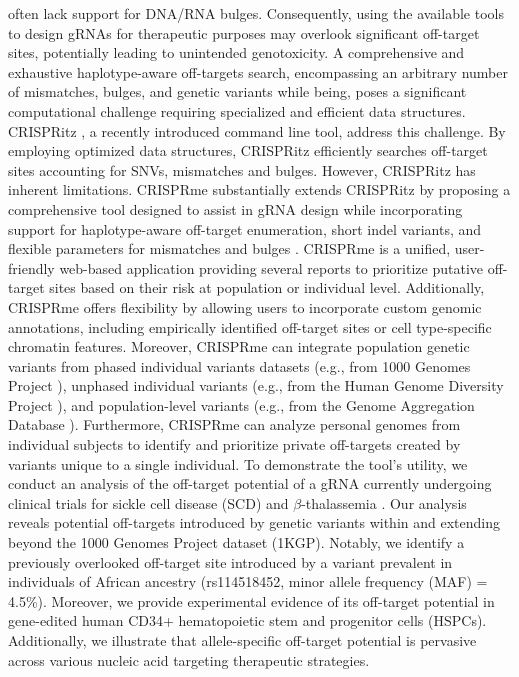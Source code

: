 \documentclass[a4paper, titlepage, openright]{book}
\newcommand{\crisprme}{CRISPRme\xspace}
\begin{document}
often lack support for DNA/RNA bulges. Consequently, using the available tools to design gRNAs for therapeutic purposes may overlook significant off-target sites, potentially leading to unintended genotoxicity. A comprehensive and exhaustive haplotype-aware off-targets search, encompassing an arbitrary number of mismatches, bulges, and genetic variants while being, poses a significant computational challenge requiring specialized and efficient data structures. CRISPRitz \citep{cancellieri2020crispritz}, a recently introduced command line tool, address this challenge. By employing optimized data structures, CRISPRitz efficiently searches off-target sites accounting for SNVs, mismatches and bulges. However, CRISPRitz has inherent limitations. \crisprme substantially extends CRISPRitz by proposing a comprehensive tool designed to assist in gRNA design while incorporating support for haplotype-aware off-target enumeration, short indel variants, and flexible parameters for mismatches and bulges \citep{cancellieri2023human}. \crisprme is a unified, user-friendly web-based application providing several reports to prioritize putative off-target sites based on their risk at population or individual level. Additionally, \crisprme offers flexibility by allowing users to incorporate custom genomic annotations, including empirically identified off-target sites or cell type-specific chromatin features. Moreover, \crisprme can integrate population genetic variants from phased individual variants datasets (e.g., from 1000 Genomes Project \citep{10002015global,lowy2019variant}), unphased individual variants (e.g., from the Human Genome Diversity Project \citep{bergstrom2020insights}), and population-level variants (e.g., from the Genome Aggregation Database \citep{karczewski2020mutational}). Furthermore, \crisprme can analyze personal genomes from individual subjects to identify and prioritize private off-targets created by variants unique to a single individual. To demonstrate the tool's utility, we conduct an analysis of the off-target potential of a gRNA currently undergoing clinical trials for sickle cell disease (SCD) and $\beta$-thalassemia \citep{frangoul2021crispr, canver2015bcl11a, wu2019highly}. Our analysis reveals potential off-targets introduced by genetic variants within and extending beyond the 1000 Genomes Project dataset (1KGP). Notably, we identify a previously overlooked off-target site introduced by a variant prevalent in individuals of African ancestry (rs114518452, minor allele frequency (MAF) = 4.5\%). Moreover, we provide experimental evidence of its off-target potential in gene-edited human CD34+ hematopoietic stem and progenitor cells (HSPCs). Additionally, we illustrate that allele-specific off-target potential is pervasive across various nucleic acid targeting therapeutic strategies.
\end{document}
